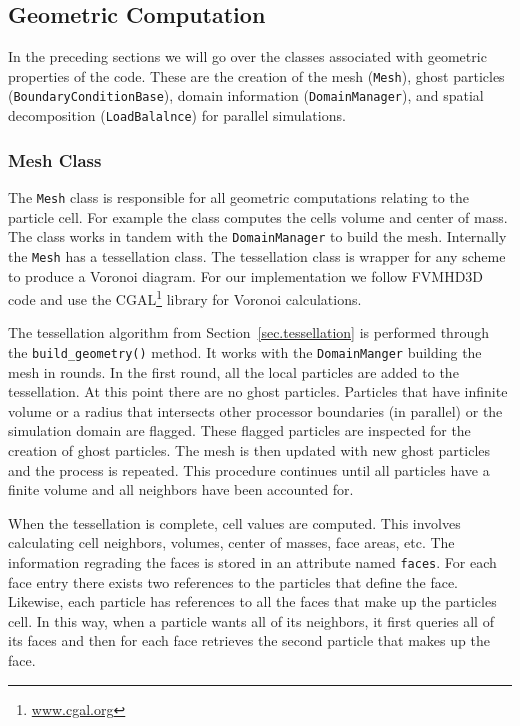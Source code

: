 \subsection{Geometric Computation}
In the preceding sections we will go over the classes associated with geometric properties
of the code. These are the creation of the mesh (\lstinline{Mesh}), ghost particles
(\lstinline{BoundaryConditionBase}), domain information (\lstinline{DomainManager}),
and spatial decomposition (\lstinline{LoadBalalnce}) for parallel simulations.

\subsubsection{Mesh Class}
The \lstinline{Mesh} class is responsible for all geometric computations relating
to the particle cell. For example the class computes the cells volume and center of mass.
The class works in tandem with the \lstinline{DomainManager} to build the mesh. Internally
the \lstinline{Mesh} has a tessellation class. The tessellation class is wrapper for
any scheme to produce a Voronoi diagram. For our implementation we follow FVMHD3D code
\citep{Gaburov2012} and use the CGAL\footnote{\url{www.cgal.org}} library
\citep{Andreas2009} for Voronoi calculations.

The tessellation algorithm from Section~\ref{sec.tessellation} is performed through the
\lstinline{build_geometry()} method. It works with the \lstinline{DomainManger} building the mesh
in rounds. In the first round, all the local particles are added to the tessellation. At this point
there are no ghost particles. Particles that have infinite volume or a radius that intersects
other processor boundaries (in parallel) or the simulation domain are flagged. These flagged
particles are inspected for the creation of ghost particles. The mesh is then updated with new
ghost particles and the process is repeated. This procedure continues until
all particles have a finite volume and all neighbors have been accounted for.

When the tessellation is complete, cell values are computed. This involves calculating
cell neighbors, volumes, center of masses, face areas, etc. The information
regrading the faces is stored in an attribute named \lstinline{faces}.
For each face entry there exists two references to the particles that define the face. Likewise,
each particle has references to all the faces that make up the particles cell.
In this way, when a particle wants all of its neighbors, it first queries all of its faces
and then for each face retrieves the second particle that makes up the face.

